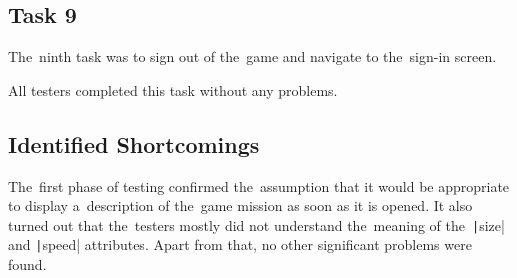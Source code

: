 \subsection*{Task 9}

The~ninth task was to sign out of the~game and navigate to the~sign-in screen.

All testers completed this task without any problems.

\subsection*{Identified Shortcomings}

The~first phase of testing confirmed the~assumption that it would be appropriate to display a~description of the~game mission as soon as it is opened.
It also turned out that the~testers mostly did not understand the~meaning of the~\texttt|size| and \texttt|speed| attributes.
Apart from that, no other significant problems were found.

